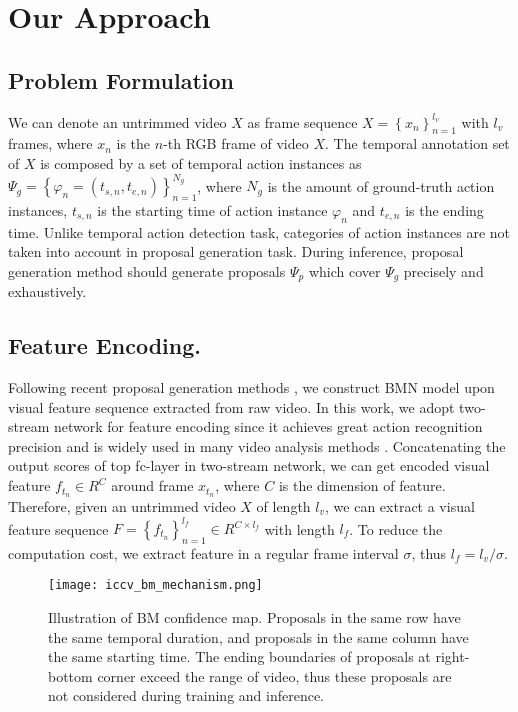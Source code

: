 \documentclass[10pt,twocolumn,letterpaper]{article}
\begin{document}
\section{Our Approach}

\subsection{Problem Formulation}

We can denote an untrimmed video $X$ as frame sequence $X=\left \{ x_n \right \}_{n=1}^{l_v}$ with $l_v$  frames, where $x_n$ is the $n$-th RGB frame of video $X$.
The temporal annotation set of $X$ is composed by
a set of temporal action instances as  $\Psi_g  = \left \{ \varphi  _n=\left (t_{s,n},t_{e,n}   \right ) \right \}_{n=1}^{N_g}$, where $N_g$ is the amount of ground-truth action instances,  $t_{s,n}$ is the starting time of action instance $\varphi_n$ and $t_{e,n} $ is the ending time.
Unlike temporal action detection task, categories of action instances are not taken into account in proposal generation task.
During inference, proposal generation method should generate proposals $\Psi_p$ which cover $\Psi_g$ precisely and exhaustively.


\subsection{Feature Encoding.}

Following recent proposal generation methods \cite{sst_buch_cvpr17, escorcia2016daps, gao2017turn,lin2018bsn}, we construct BMN model upon visual feature sequence extracted from raw video. 
In this work, we adopt two-stream network \cite{simonyan2014two} for feature encoding since it achieves great action recognition precision and is widely used in many video analysis methods \cite{gao2017cascaded,ssad,zhao2017temporal}.
Concatenating the output scores of top fc-layer in two-stream network, we can get encoded visual feature $f_{t_n} \in R^{C}$ around frame $x_{t_n}$, where $C$ is the dimension of feature.
Therefore, given an untrimmed video $X$ of length $l_v$, we can extract a visual feature sequence $F=\left \{ f_{t_n} \right \}_{n=1}^{l_f} \in R^{C\times l_f}$ with length $l_f$.
To reduce the computation cost, we extract feature in a regular frame interval $\sigma$, thus $l_f=l_v/\sigma$.


\begin{figure}[t]
\begin{center}
\begin{minipage}[b]{1.0\linewidth}
  \centering
  \centerline{\texttt{[image: iccv\_bm\_mechanism.png]}}
  \medskip
\end{minipage}
\end{center}
   \caption{Illustration of BM confidence map. Proposals in the same row have the same temporal duration, and proposals in the same column have the same starting time. The ending boundaries of proposals at right-bottom corner exceed the range of  video, thus these proposals are not considered during training and inference.}
\label{fig:bm_mechanism}
\end{figure}
\end{document}
